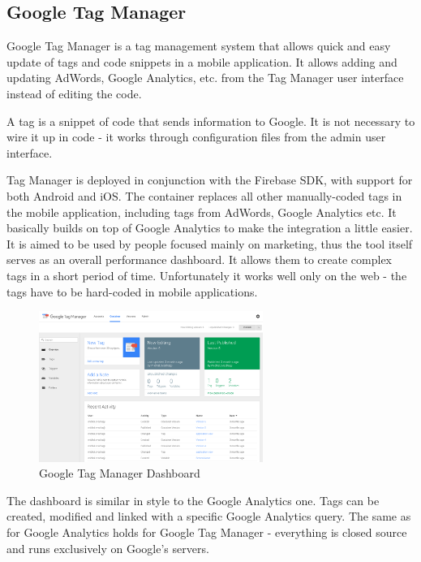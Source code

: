 \subsection{Google Tag Manager}

Google Tag Manager is a tag management system that allows quick and easy update of tags and code snippets in a mobile application. It allows adding and updating AdWords, Google Analytics, etc. from the Tag Manager user interface instead of editing the code.

A tag is a snippet of code that sends information to Google. It is not necessary to wire it up in code - it works through configuration files from the admin user interface.

Tag Manager is deployed in conjunction with the Firebase SDK, with support for both Android and iOS. The container replaces all other manually-coded tags in the mobile application, including tags from AdWords, Google Analytics etc. It basically builds on top of Google Analytics to make the integration a little easier. It is aimed to be used by people focused mainly on marketing, thus the tool itself serves as an overall performance dashboard. It allows them to create complex tags in a short period of time. Unfortunately it works well only on the web - the tags have to be hard-coded in mobile applications.

\newpage

\begin{figure}[!ht]
	\centering
	\includegraphics[width=0.65\textwidth]{figures/tagmanager}
    \caption{Google Tag Manager Dashboard}
\end{figure}

The dashboard is similar in style to the Google Analytics one. Tags can be created, modified and linked with a specific Google Analytics query. The same as for Google Analytics holds for Google Tag Manager - everything is closed source and runs exclusively on Google's servers.

